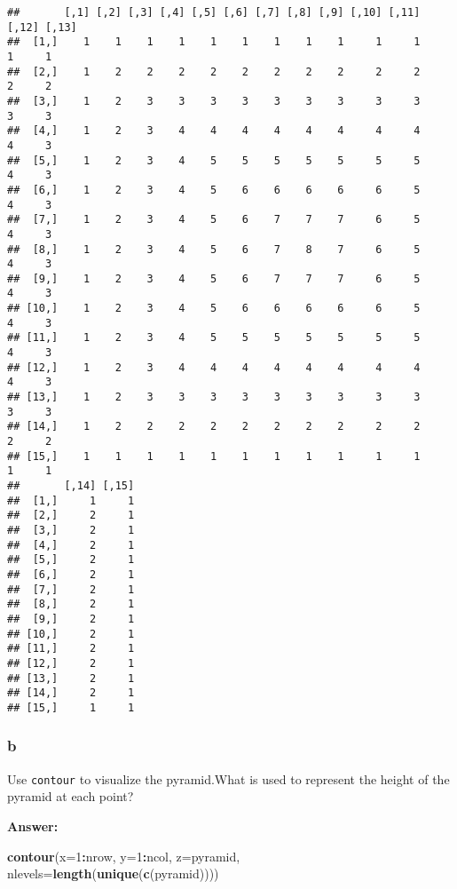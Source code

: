 \documentclass[]{article}
\newenvironment{Shaded}{\begin{snugshade}}{\end{snugshade}}
\newcommand{\DataTypeTok}[1]{\textcolor[rgb]{0.13,0.29,0.53}{#1}}
\newcommand{\DecValTok}[1]{\textcolor[rgb]{0.00,0.00,0.81}{#1}}
\newcommand{\KeywordTok}[1]{\textcolor[rgb]{0.13,0.29,0.53}{\textbf{#1}}}
\newcommand{\NormalTok}[1]{#1}
\newcommand{\OperatorTok}[1]{\textcolor[rgb]{0.81,0.36,0.00}{\textbf{#1}}}
\begin{document}
\begin{verbatim}
##       [,1] [,2] [,3] [,4] [,5] [,6] [,7] [,8] [,9] [,10] [,11] [,12] [,13]
##  [1,]    1    1    1    1    1    1    1    1    1     1     1     1     1
##  [2,]    1    2    2    2    2    2    2    2    2     2     2     2     2
##  [3,]    1    2    3    3    3    3    3    3    3     3     3     3     3
##  [4,]    1    2    3    4    4    4    4    4    4     4     4     4     3
##  [5,]    1    2    3    4    5    5    5    5    5     5     5     4     3
##  [6,]    1    2    3    4    5    6    6    6    6     6     5     4     3
##  [7,]    1    2    3    4    5    6    7    7    7     6     5     4     3
##  [8,]    1    2    3    4    5    6    7    8    7     6     5     4     3
##  [9,]    1    2    3    4    5    6    7    7    7     6     5     4     3
## [10,]    1    2    3    4    5    6    6    6    6     6     5     4     3
## [11,]    1    2    3    4    5    5    5    5    5     5     5     4     3
## [12,]    1    2    3    4    4    4    4    4    4     4     4     4     3
## [13,]    1    2    3    3    3    3    3    3    3     3     3     3     3
## [14,]    1    2    2    2    2    2    2    2    2     2     2     2     2
## [15,]    1    1    1    1    1    1    1    1    1     1     1     1     1
##       [,14] [,15]
##  [1,]     1     1
##  [2,]     2     1
##  [3,]     2     1
##  [4,]     2     1
##  [5,]     2     1
##  [6,]     2     1
##  [7,]     2     1
##  [8,]     2     1
##  [9,]     2     1
## [10,]     2     1
## [11,]     2     1
## [12,]     2     1
## [13,]     2     1
## [14,]     2     1
## [15,]     1     1
\end{verbatim}

\hypertarget{b-7}{%
\subsubsection{b}\label{b-7}}

Use \texttt{contour} to visualize the pyramid.What is used to represent
the height of the pyramid at each point?

\textbf{Answer:}

\begin{Shaded}
\begin{Highlighting}[]
\KeywordTok{contour}\NormalTok{(}\DataTypeTok{x=}\DecValTok{1}\OperatorTok{:}\NormalTok{nrow, }\DataTypeTok{y=}\DecValTok{1}\OperatorTok{:}\NormalTok{ncol, }\DataTypeTok{z=}\NormalTok{pyramid, }\DataTypeTok{nlevels=}\KeywordTok{length}\NormalTok{(}\KeywordTok{unique}\NormalTok{(}\KeywordTok{c}\NormalTok{(pyramid))))}
\end{Highlighting}
\end{Shaded}
\end{document}
